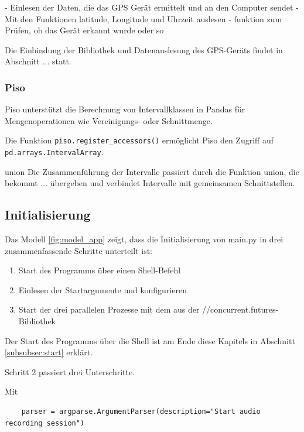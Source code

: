 - Einlesen der Daten, die das GPS Gerät ermittelt und an den Computer sendet
- Mit den Funktionen latitude, Longitude und Uhrzeit auslesen
- funktion zum Prüfen, ob das Gerät erkannt wurde oder so %

Die Einbindung der Bibliothek und Datenauslesung des GPS-Geräts findet in Abschnitt ... statt.


\subsubsection{Piso}
\label{subsubsec:piso}

Piso unterstützt die Berechnung von Intervallklassen in Pandas für Mengenoperationen wie Vereinigungs- oder Schnittmenge.

Die Funktion \lstinline{piso.register_accessors()} ermöglicht Piso den Zugriff auf \lstinline{pd.arrays.IntervalArray}. 

union
Die Zusammenführung der Intervalle passiert durch die Funktion union, die bekommt ... übergeben und verbindet Intervalle mit gemeinsamen Schnittstellen.


\subsection{Initialisierung}
\label{sec:Initialisierung}


Das Modell \ref{fig:model_app} zeigt, dass die Initialisierung von main.py in drei zusammenfassende Schritte unterteilt ist:

\begin{enumerate}
    \item Start des Programms über einen Shell-Befehl
    \item Einlesen der Startargumente und konfigurieren
    \item Start der drei parallelen Prozesse mit dem  aus der //concurrent.futures-Bibliothek
\end{enumerate}


Der Start des Programms über die Shell ist am Ende diese Kapitels in Abschnitt \ref{subsubsec:start} erklärt.

Schritt 2 passiert drei Unterschritte.

Mit
\begin{lstlisting}
    parser = argparse.ArgumentParser(description="Start audio recording session")
\end{lstlisting}

